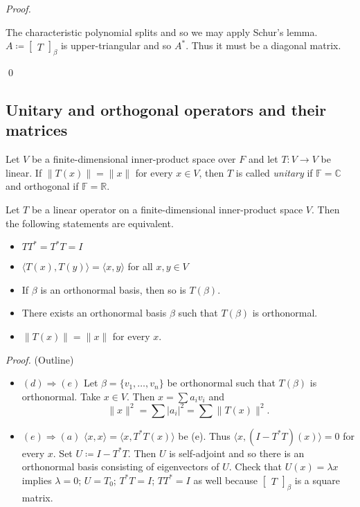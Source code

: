 \documentclass[12pt]{article}
\newenvironment{theorem}[2][Theorem]{\begin{trivlist}
\item[\hskip \labelsep {\bfseries #1}\hskip \labelsep {\bfseries #2.}]}{\end{trivlist}}
\newenvironment{definition}[2][Definition]{\begin{trivlist}
\item[\hskip \labelsep {\bfseries #1}\hskip \labelsep {\bfseries #2}]}{\end{trivlist}}
\newenvironment{sol}
    {\emph{Proof.}
    }
    {
    \qed
    }
\begin{document}
\begin{sol}
The characteristic polynomial splits and so we may apply Schur's lemma. $A \coloneqq \begin{bmatrix} T \end{bmatrix}_\beta$ is upper-triangular and so $A^*$. Thus it must be a diagonal matrix.
\end{sol}

\subsection{Unitary and orthogonal operators and their matrices}

\begin{definition}{9}
Let $V$ be a finite-dimensional inner-product space over $F$ and let $T : V \to V$ be linear. If $\lVert T(x) \rVert = \lVert x \rVert$ for every $x \in V$, then $T$ is called \textit{unitary} if $\mathbb{F} = \mathbb{C}$ and orthogonal if $\mathbb{F} = \mathbb{R}$. 
\end{definition}

\begin{theorem}{6.18}
Let $T$ be a linear operator on a finite-dimensional inner-product space $V$. Then the following statements are equivalent.

\begin{itemize}
    \item[(a)] $TT^* = T^*T = I$
    
    \item[(b)] $\langle T(x), T(y) \rangle = \langle x, y \rangle$ for all $x, y \in V$
    
    \item[(c)] If $\beta$ is an orthonormal basis, then so is $T(\beta)$.
    
    \item[(d)] There exists an orthonormal basis $\beta$ such that $T(\beta)$ is orthonormal.
    
    \item[(e)] $\lVert T(x) \lVert = \lVert x \rVert$ for every $x$.
\end{itemize}
\end{theorem}

\textit{Proof.} (Outline) 

\begin{itemize}
    \item $(d) \Longrightarrow (e)$ Let $\beta = \{v_1, \dots, v_n\}$ be orthonormal such that $T(\beta)$ is orthonormal. Take $x \in V$. Then $x = \sum a_iv_i$ and $$\lVert x \rVert^2 = \sum \lvert a_i \rvert^2 = \sum \lVert T(x) \rVert^2.$$  
    
    \item $(e) \Longrightarrow (a)$ $\langle x, x \rangle = \langle x, T^*T(x) \rangle$ be (e). Thus $\langle x, (I - T^*T)(x) \rangle = 0$ for every $x$. Set $U \coloneqq I - T^*T$. Then $U$ is self-adjoint and so there is an orthonormal basis consisting of eigenvectors of $U$. Check that $U(x) = \lambda x$ implies $\lambda = 0$; $U = T_0$; $T^*T = I$; $TT^* = I$ as well because $\begin{bmatrix} T \end{bmatrix}_\beta$ is a square matrix.
\end{itemize}
\end{document}
